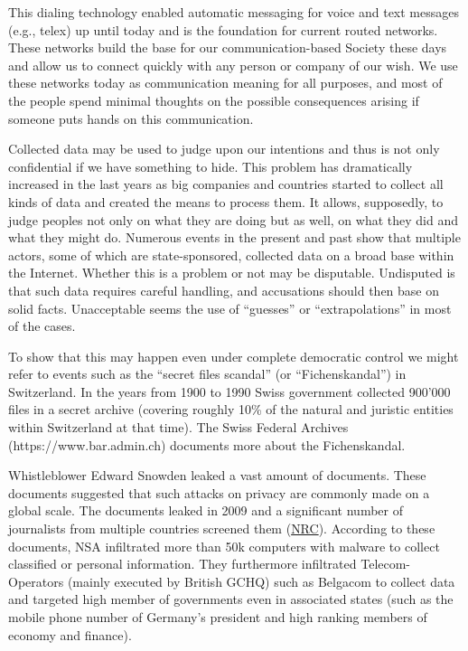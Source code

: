 \documentclass[10pt,journal,compsoc]{IEEEtran}
\begin{document}
This dialing technology enabled automatic messaging for voice and text messages (e.g., telex) up until today and is the foundation for current routed networks. These networks build the base for our communication-based Society these days and allow us to connect quickly with any person or company of our wish. We use these networks today as communication meaning for all purposes, and most of the people spend minimal thoughts on the possible consequences arising if someone puts hands on this communication. 

Collected data may be used to judge upon our intentions and thus is not only confidential if we have something to hide. This problem has dramatically increased in the last years as big companies and countries started to collect all kinds of data and created the means to process them. It allows, supposedly, to judge peoples not only on what they are doing but as well, on what they did and what they might do. Numerous events in the present and past show that multiple actors, some of which are state-sponsored, collected data on a broad base within the Internet. Whether this is a problem or not may be disputable. Undisputed is that such data requires careful handling, and accusations should then base on solid facts. Unacceptable seems the use of ``guesses'' or ``extrapolations'' in most of the cases.

To show that this may happen even under complete democratic control we might refer to events such as the ``secret files scandal'' (or  ``Fichenskandal'') in Switzerland. In the years from 1900 to 1990 Swiss government collected 900’000 files in a secret archive (covering roughly 10\% of the natural and juristic entities within Switzerland at that time). The Swiss Federal Archives (https://www.bar.admin.ch) documents more about the Fichenskandal.

Whistleblower Edward Snowden leaked a vast amount of documents. These documents suggested that such attacks on privacy are commonly made on a global scale. The documents leaked in 2009 and a significant number of journalists from multiple countries screened them (\href{http://www.nrc.nl/nieuws/2013/11/23/nederland-sinds-1946-doelwit-van-nsa}{NRC}). According to these documents, NSA infiltrated more than 50k computers with malware to collect classified or personal information. They furthermore infiltrated Telecom-Operators (mainly executed by British GCHQ) such as Belgacom to collect data and targeted high member of governments even in associated states (such as the mobile phone number of Germany's president and high ranking members of economy and finance).
\end{document}
